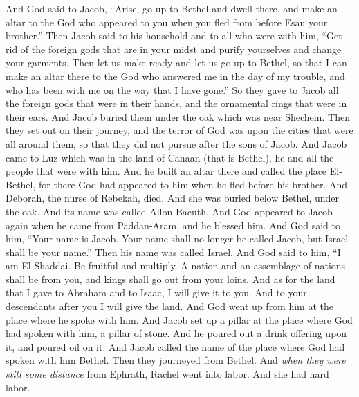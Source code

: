 \begin{biblechapter} %
 And God said to Jacob, “Arise, go up to Bethel and dwell there, and make an altar to the God who appeared to you when you fled from before Esau your brother.”
\verse Then Jacob said to his household and to all who were with him, “Get rid of the foreign gods that are in your midst and purify yourselves and change your garments.
\verse Then let us make ready and let us go up to Bethel, so that I can make an altar there to the God who answered me in the day of my trouble, and who has been with me on the way that I have gone.”
\verse So they gave to Jacob all the foreign gods that were in their hands, and the ornamental rings that were in their ears. And Jacob buried them under the oak which was near Shechem.
\verse Then they set out on their journey, and the terror of God was upon the cities that were all around them, so that they did not pursue after the sons of Jacob.
\verse And Jacob came to Luz which was in the land of Canaan (that is Bethel), he and all the people that were with him.
\verse And he built an altar there and called the place El-Bethel, for there God had appeared to him when he fled before his brother.
\verse And Deborah, the nurse of Rebekah, died. And she was buried below Bethel, under the oak. And its name was called Allon-Bacuth.
\verse And God appeared to Jacob again when he came from Paddan-Aram, and he blessed him.
\verse And God said to him, “Your name is Jacob. Your name shall no longer be called Jacob, but Israel shall be your name.” Then his name was called Israel.
\verse And God said to him, “I am El-Shaddai. Be fruitful and multiply. A nation and an assemblage of nations shall be from you, and kings shall go out from your loins.
\verse And as for the land that I gave to Abraham and to Isaac, I will give it to you. And to your descendants after you I will give the land.
\verse And God went up from him at the place where he spoke with him.
\verse And Jacob set up a pillar at the place where God had spoken with him, a pillar of stone. And he poured out a drink offering upon it, and poured oil on it.
\verse And Jacob called the name of the place where God had spoken with him Bethel.
 Then they journeyed from Bethel. And \textit{when they were still some distance} from Ephrath, Rachel went into labor. And she had hard labor.

\end{biblechapter}

